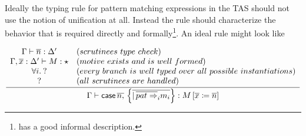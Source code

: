 
Ideally the typing rule for pattern matching \case{} expressions in the TAS should not use the notion of unification at all.
Instead the rule should characterize the behavior that is required directly and formally\footnote{
  \cite{coquand1992pattern} has a good informal description.
}.
An ideal rule might look like

\[
\frac{\begin{array}{cl}
\Gamma\vdash\overline{n}:\Delta' & (\scruts{}\ type\ check)\\
\Gamma,\overline{x}:\Delta'\vdash M:\star & (motive\ exists\ and\ is\ well\ formed)\\
\forall i.\:? & (every\ branch\ is\ well\ typed\ over\ all\ possible\ instantiations)\\
? & (all\ \scruts{}\ are\ handled)
\end{array}}{\Gamma\vdash \case{} \,\overline{n,}\,\left\{ \overline{|\,\overline{pat\Rightarrow}_{i}m_{i}}\right\} :M\left[\overline{x}\coloneqq\overline{n}\right]}
\]

